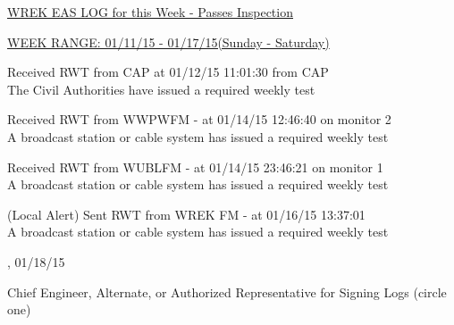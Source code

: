 \documentclass{article}
\begin{document}
\noindent \underline{\underline{WREK EAS LOG for this Week - Passes Inspection}} 

\medskip

\noindent \underline{WEEK RANGE: 01/11/15 - 01/17/15(Sunday - Saturday)}

\medskip

\hspace{20 pt}     Received RWT from CAP at 01/12/15 11:01:30 from CAP \\\hspace{20pt}     The Civil Authorities have issued a required weekly test

\medskip

\hspace{20 pt}     Received RWT from WWPWFM - at 01/14/15 12:46:40 on monitor 2\\\hspace{20pt}     A broadcast station or cable system has issued a required weekly test

\medskip

\hspace{20 pt}     Received RWT from WUBLFM - at 01/14/15 23:46:21 on monitor 1\\\hspace{20pt}     A broadcast station or cable system has issued a required weekly test

\medskip

\hspace{20 pt}     (Local Alert) Sent RWT from WREK FM - at 01/16/15 13:37:01\\\hspace{20pt}     A broadcast station or cable system has issued a required weekly test

\medskip


 \underline{\hspace{100 pt}}, 01/18/15

\medskip

{\large{Chief Engineer, Alternate, or Authorized  Representative for Signing Logs \newline (circle one)}} 

\medskip

 \noindent 

\medskip
\end{document}
